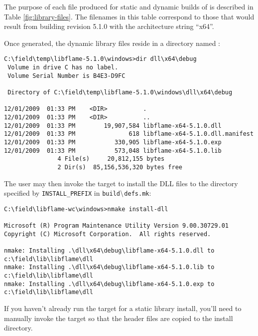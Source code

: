 The purpose of each file produced for static and dynamic builds of \libflame
is described in Table \ref{fig:library-files}.
The filenames in this table correspond to those that would result from building
revision 5.1.0 with the architecture string ``x64''.

Once generated, the dynamic library files reside in a directory named \dllns:

\begin{Verbatim}[frame=single,framesep=2.5mm,xleftmargin=5mm,fontsize=\footnotesize]
C:\field\temp\libflame-5.1.0\windows>dir dll\x64\debug
 Volume in drive C has no label.
 Volume Serial Number is B4E3-D9FC

 Directory of C:\field\temp\libflame-5.1.0\windows\dll\x64\debug

12/01/2009  01:33 PM    <DIR>          .
12/01/2009  01:33 PM    <DIR>          ..
12/01/2009  01:33 PM        19,907,584 libflame-x64-5.1.0.dll
12/01/2009  01:33 PM               618 libflame-x64-5.1.0.dll.manifest
12/01/2009  01:33 PM           330,905 libflame-x64-5.1.0.exp
12/01/2009  01:33 PM           573,048 libflame-x64-5.1.0.lib
               4 File(s)     20,812,155 bytes
               2 Dir(s)  85,156,536,320 bytes free
\end{Verbatim}

\noindent
The user may then invoke the \installdll target to install the DLL files
to the directory specified by {\tt INSTALL\_PREFIX} in
{\tt build$\backslash$defs.mk}:

\begin{Verbatim}[frame=single,framesep=2.5mm,xleftmargin=5mm,fontsize=\footnotesize]
C:\field\libflame-wc\windows>nmake install-dll

Microsoft (R) Program Maintenance Utility Version 9.00.30729.01
Copyright (C) Microsoft Corporation.  All rights reserved.

nmake: Installing .\dll\x64\debug\libflame-x64-5.1.0.dll to c:\field\lib\libflame\dll
nmake: Installing .\dll\x64\debug\libflame-x64-5.1.0.lib to c:\field\lib\libflame\dll
nmake: Installing .\dll\x64\debug\libflame-x64-5.1.0.exp to c:\field\lib\libflame\dll
\end{Verbatim}

If you haven't already run the \install target for a static library install,
you'll need to manually invoke the \installheaders target so that the
\libflame header files are copied to the install directory.





